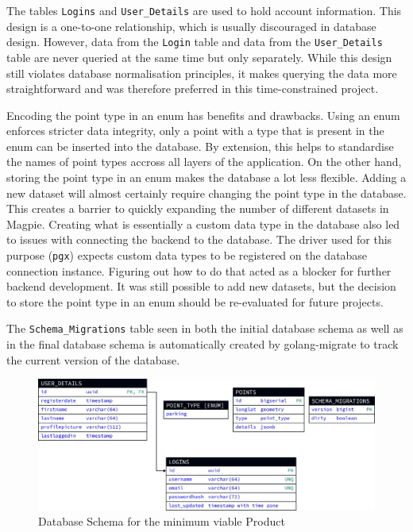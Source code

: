 The tables \texttt{Logins} and \texttt{User\_Details} are used to hold account
information. This design is a one-to-one relationship, which is usually
discouraged in database design. However, data from the \texttt{Login} table and
data from the \texttt{User\_Details} table are never queried at the same time
but only separately. While this design still violates database normalisation
principles, it makes querying the data more straightforward and was therefore
preferred in this time-constrained project.

Encoding the point type in an enum has benefits and drawbacks. Using an enum
enforces stricter data integrity, only a point with a type that is present in
the enum can be inserted into the database. By extension, this helps to
standardise the names of point types accross all layers of the application. On
the other hand, storing the point type in an enum makes the database a lot less
flexible. Adding a new dataset will almost certainly require changing the point
type in the database. This creates a barrier to quickly expanding the number of
different datasets in Magpie. Creating what is essentially a custom data type in
the database also led to issues with connecting the backend to the database. The
driver used for this purpose (\texttt{pgx}) expects custom data types to be
registered on the database connection instance. Figuring out how to do that
acted as a blocker for further backend development. It was still possible to add
new datasets, but the decision to store the point type in an enum should be
re-evaluated for future projects.

The \texttt{Schema\_Migrations} table seen in both the initial database schema
as well as in the final database schema is automatically created by
golang-migrate to track the current version of the database.

\begin{figure}[htbp]
  \centering{}
  \includegraphics[width=\textwidth]{../d2-diagrams/database-init/database-init.png}
  \caption{Database Schema for the minimum viable Product}
  \label{fig:database_init_schema}
\end{figure}

